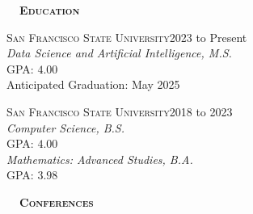 \documentclass[hidelinks, 10.5pt]{article}
\def\contentwidth{0.9\linewidth}    %
\def\contentblockspacing{2.5mm}     %
\def\sectionspacing{8mm}            %
\def\sectiontocontentspacing{4mm}   %
\renewcommand{\section}[1]{
    {\fontsize{14}{14}\selectfont \textsc{\textbf{\ \ #1\ \ }}}\hrulefill
}
\begin{document}
{\centering
\vspace{\contentblockspacing}

\section{Education}

\vspace{\sectiontocontentspacing}

\begin{minipage}[ct]{0.9\linewidth}
    {\textsc{San Francisco State University}}\hfill 2023 to Present\\
    \emph{Data Science and Artificial Intelligence, M.S.}\\
    GPA: $4.00$\\
    Anticipated Graduation: May 2025
\end{minipage}

\vspace{\contentblockspacing}

\begin{minipage}[ct]{\contentwidth}
    {\textsc{San Francisco State University}}\hfill 2018 to 2023\\
    \emph{Computer Science, B.S.}\\
    GPA: $4.00$\\
    \emph{Mathematics: Advanced Studies, B.A.}\\
    GPA: $3.98$
\end{minipage}



\vspace{\sectionspacing}


\section{Conferences}

\vspace{\sectiontocontentspacing}

}
\end{document}
